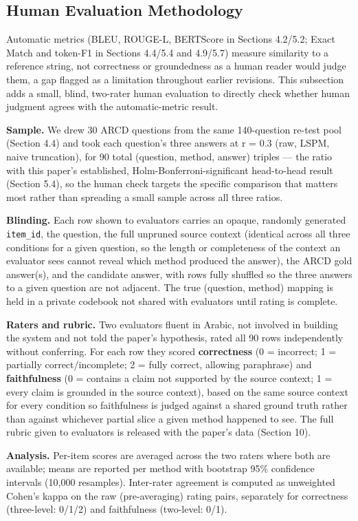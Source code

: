 \subsection{Human Evaluation Methodology}
Automatic metrics (BLEU, ROUGE-L, BERTScore in Sections 4.2/5.2; Exact Match and token-F1 in Sections 4.4/5.4 and 4.9/5.7) measure similarity to a reference string, not correctness or groundedness as a human reader would judge them, a gap flagged as a limitation throughout earlier revisions. This subsection adds a small, blind, two-rater human evaluation to directly check whether human judgment agrees with the automatic-metric result.

\textbf{Sample.} We drew 30 ARCD questions from the same 140-question re-test pool (Section 4.4) and took each question's three answers at r = 0.3 (raw, LSPM, naive truncation), for 90 total (question, method, answer) triples --- the ratio with this paper's established, Holm-Bonferroni-significant head-to-head result (Section 5.4), so the human check targets the specific comparison that matters most rather than spreading a small sample across all three ratios.

\textbf{Blinding.} Each row shown to evaluators carries an opaque, randomly generated \texttt{item\_id}, the question, the full unpruned source context (identical across all three conditions for a given question, so the length or completeness of the context an evaluator sees cannot reveal which method produced the answer), the ARCD gold answer(s), and the candidate answer, with rows fully shuffled so the three answers to a given question are not adjacent. The true (question, method) mapping is held in a private codebook not shared with evaluators until rating is complete.

\textbf{Raters and rubric.} Two evaluators fluent in Arabic, not involved in building the system and not told the paper's hypothesis, rated all 90 rows independently without conferring. For each row they scored \textbf{correctness} (0 = incorrect; 1 = partially correct/incomplete; 2 = fully correct, allowing paraphrase) and \textbf{faithfulness} (0 = contains a claim not supported by the source context; 1 = every claim is grounded in the source context), based on the same source context for every condition so faithfulness is judged against a shared ground truth rather than against whichever partial slice a given method happened to see. The full rubric given to evaluators is released with the paper's data (Section 10).

\textbf{Analysis.} Per-item scores are averaged across the two raters where both are available; means are reported per method with bootstrap 95\% confidence intervals (10,000 resamples). Inter-rater agreement is computed as unweighted Cohen's kappa on the raw (pre-averaging) rating pairs, separately for correctness (three-level: 0/1/2) and faithfulness (two-level: 0/1).

